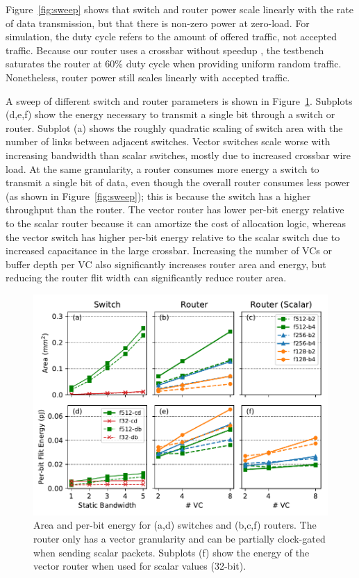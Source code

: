 Figure~\ref{fig:sweep} shows that switch and router power scale linearly with the rate of data transmission, but that there is non-zero power at zero-load. 
For simulation, the duty cycle refers to the amount of offered traffic, not accepted traffic.
Because our router uses a crossbar without speedup \cite{dallytowles}, the testbench saturates the router at 60\% duty cycle when providing uniform random traffic. 
Nonetheless, router power still scales linearly with accepted traffic.

A sweep of different switch and router parameters is shown in Figure~\ref{fig:char}. Subplots (d,e,f) show the energy necessary to transmit a single bit through a switch or router.
Subplot (a) shows the roughly quadratic scaling of switch area with the number of links between adjacent switches.
Vector switches scale worse with increasing bandwidth than scalar switches, mostly due to increased crossbar wire load. 
At the same granularity, a router consumes more energy a switch to transmit a single bit of data, even though the overall router consumes less power (as shown in Figure~\ref{fig:sweep}); 
this is because the switch has a higher throughput than the router.
The vector router has lower per-bit energy relative to the scalar router because it can amortize the cost of allocation logic, whereas the vector switch has higher per-bit energy relative to the scalar switch due to increased capacitance in the large crossbar. 
Increasing the number of VCs or buffer depth per VC also significantly increases router area and energy, but reducing the router flit width can significantly reduce router area. 

\begin{figure}
\centering
\includegraphics[width=0.8\columnwidth]{network/figs/char.pdf}
  \caption{Area and per-bit energy for (a,d) switches and (b,c,f) routers. 
  The router only has a vector granularity and can be partially clock-gated when sending scalar packets.
  Subplots (f) show the energy of the vector router when used for scalar values (32-bit).}\label{fig:char}
\end{figure}

